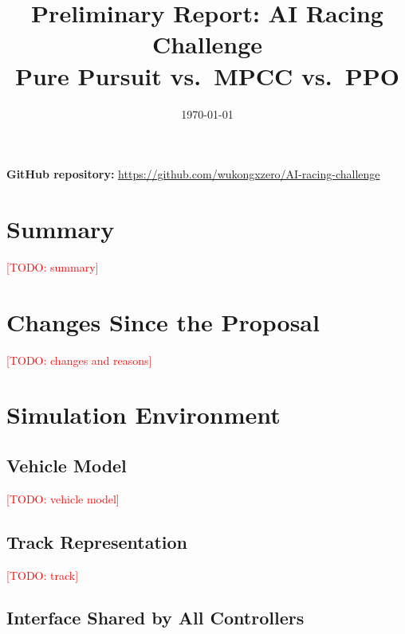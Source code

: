 \documentclass[12pt]{article}
\title{\textbf{Preliminary Report: AI Racing Challenge} \\ \large Pure Pursuit vs.\ MPCC vs.\ PPO}
\author{\todo{Nataly, Berinay, Christian, Pavan}}
\date{\today}
\newcommand{\todo}[1]{\textcolor{red}{[TODO: #1]}}
\begin{document}
\maketitle

\noindent\textbf{GitHub repository:} \url{https://github.com/wukongxzero/AI-racing-challenge}

\section{Summary}

\todo{summary}

\section{Changes Since the Proposal}

\todo{changes and reasons}

\section{Simulation Environment}
\subsection{Vehicle Model}

\todo{vehicle model}

\subsection{Track Representation}

\todo{track}

\subsection{Interface Shared by All Controllers}
\end{document}
